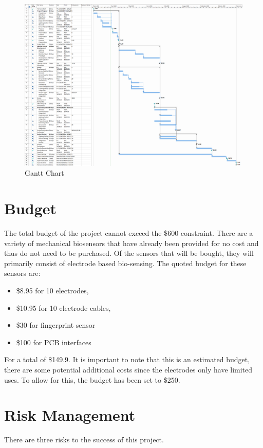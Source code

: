 \begin{figure}[!ht]
    \caption{Gantt Chart}\label{fig:gantt}
    \centering
    \includegraphics[width=2\columnwidth]{project_plan/figures/Gantt_Chart}
\end{figure}

\section{Budget}
The total budget of the project cannot exceed the \$600 constraint.
There are a variety of mechanical biosensors that have already been provided for no cost and thus do not need to be purchased.
Of the sensors that will be bought, they will primarily consist of electrode based bio-sensing.
The quoted budget for these sensors are:

\begin{itemize}
    \item \$8.95 for 10 electrodes,
    \item \$10.95 for 10 electrode cables,
    \item \$30 for fingerprint sensor
    \item \$100 for PCB interfaces
\end{itemize}

For a total of \$149.9.
It is important to note that this is an estimated budget,
there are some potential additional costs since the electrodes only have limited uses.
To allow for this, the budget has been set to \$250.

\section{Risk Management}
There are three risks to the success of this project.

